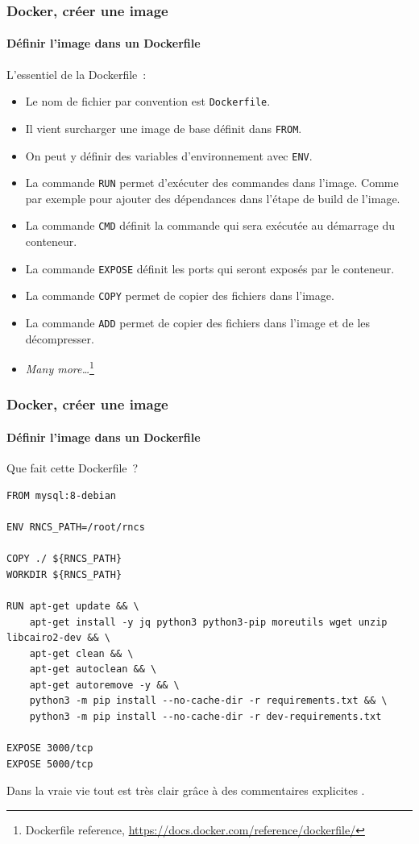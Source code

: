 \documentclass{beamer}
\begin{document}
    \begin{frame}
        \transdissolve
        \frametitle{Docker, créer une image}
        \framesubtitle{Définir l'image dans un Dockerfile}
        L'essentiel de la Dockerfile~:
        \begin{itemize}
            \item Le nom de fichier par convention est \lstinline{Dockerfile}.
            \item Il vient surcharger une image de base définit dans \lstinline{FROM}.
            \item On peut y définir des variables d'environnement avec \lstinline{ENV}.
            \item La commande \lstinline{RUN} permet d'exécuter des commandes dans l'image.
            Comme par exemple pour ajouter des dépendances dans l'étape de build de l'image.
            \item La commande \lstinline{CMD} définit la commande qui sera exécutée au démarrage du conteneur.
            \item La commande \lstinline{EXPOSE} définit les ports qui seront exposés par le conteneur.
            \item La commande \lstinline{COPY} permet de copier des fichiers dans l'image.
            \item La commande \lstinline{ADD} permet de copier des fichiers dans l'image et de les décompresser.
            \item \textit{Many more\ldots}\footnote{Dockerfile reference, \url{https://docs.docker.com/reference/dockerfile/}}
        \end{itemize}

    \end{frame}

    \begin{frame}[fragile]
        \transdissolve
        \frametitle{Docker, créer une image}
        \framesubtitle{Définir l'image dans un Dockerfile}
        Que fait cette Dockerfile~?
        \begin{lstlisting}[basicstyle=\ttfamily\tiny]
FROM mysql:8-debian

ENV RNCS_PATH=/root/rncs

COPY ./ ${RNCS_PATH}
WORKDIR ${RNCS_PATH}

RUN apt-get update && \
    apt-get install -y jq python3 python3-pip moreutils wget unzip libcairo2-dev && \
    apt-get clean && \
    apt-get autoclean && \
    apt-get autoremove -y && \
    python3 -m pip install --no-cache-dir -r requirements.txt && \
    python3 -m pip install --no-cache-dir -r dev-requirements.txt

EXPOSE 3000/tcp
EXPOSE 5000/tcp
        \end{lstlisting}
        Dans la vraie vie tout est très clair grâce à des commentaires explicites .
    \end{frame}
\end{document}

